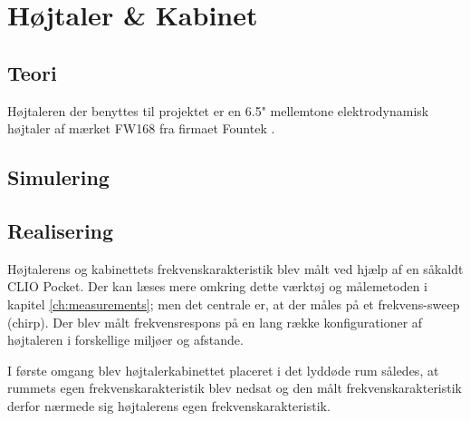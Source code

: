 \chapter{Højtaler \& Kabinet}

\section{Teori}
Højtaleren der benyttes til projektet er en 6.5" mellemtone elektrodynamisk højtaler af mærket FW168\cite{FW168} fra firmaet Fountek \cite{Fountek}.

\section{Simulering}

\newpage
\section{Realisering}
Højtalerens og kabinettets frekvenskarakteristik blev målt ved hjælp af en såkaldt CLIO Pocket. Der kan læses mere omkring dette værktøj og målemetoden i kapitel \ref{ch:measurements}; men det centrale er, at der måles på et frekvens-sweep (chirp). Der blev målt frekvensrespons på en lang række konfigurationer af højtaleren i forskellige miljøer og afstande.

I første omgang blev højtalerkabinettet placeret i det lyddøde rum således, at rummets egen frekvenskarakteristik blev nedsat og den målt frekvenskarakteristik derfor nærmede sig højtalerens egen frekvenskarakteristik.

